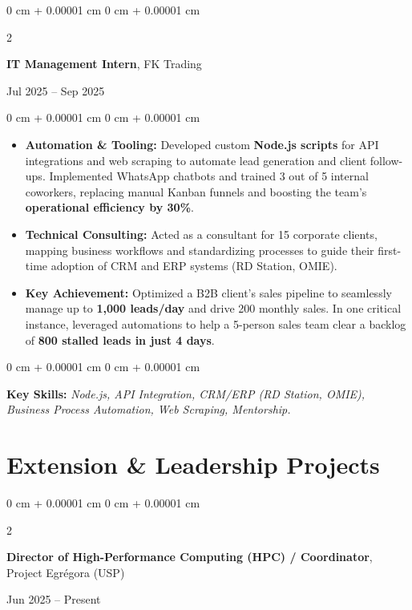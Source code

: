 \documentclass[10pt, letterpaper]{article}
\newenvironment{highlights}{
    \begin{itemize}[
        topsep=0.10 cm,
        parsep=0.10 cm,
        partopsep=0pt,
        itemsep=0pt,
        leftmargin=0 cm + 10pt
    ]
}{
    \end{itemize}
} %
\newenvironment{onecolentry}{
    \begin{adjustwidth}{
        0 cm + 0.00001 cm
    }{
        0 cm + 0.00001 cm
    }
}{
    \end{adjustwidth}
} %
\newenvironment{twocolentry}[2][]{
    \onecolentry
    \def\secondColumn{#2}
    \setcolumnwidth{\fill, 4.5 cm}
    \begin{paracol}{2}
}{
    \switchcolumn \raggedleft \secondColumn
    \end{paracol}
    \endonecolentry
} %
\begin{document}
\vspace{0.20 cm}

\begin{twocolentry}{
    Jul 2025 – Sep 2025
}
    \textbf{IT Management Intern}, FK Trading
\end{twocolentry}

\vspace{0.10 cm}
\begin{onecolentry}
\begin{highlights}
        \item \textbf{Automation \& Tooling:} Developed custom \textbf{Node.js scripts} for API integrations and web scraping to automate lead generation and client follow-ups. Implemented WhatsApp chatbots and trained 3 out of 5 internal coworkers, replacing manual Kanban funnels and boosting the team's \textbf{operational efficiency by 30\%}.
        \item \textbf{Technical Consulting:} Acted as a consultant for 15 corporate clients, mapping business workflows and standardizing processes to guide their first-time adoption of CRM and ERP systems (RD Station, OMIE).
        \item \textbf{Key Achievement:} Optimized a B2B client's sales pipeline to seamlessly manage up to \textbf{1,000 leads/day} and drive 200 monthly sales. In one critical instance, leveraged automations to help a 5-person sales team clear a backlog of \textbf{800 stalled leads in just 4 days}.
    \end{highlights}
\end{onecolentry}
\vspace{0.10 cm}
\begin{onecolentry}
    \setlength{\leftskip}{0.3cm}
    {\footnotesize \textbf{Key Skills:} \textit{Node.js, API Integration, CRM/ERP (RD Station, OMIE), Business Process Automation, Web Scraping, Mentorship.}}
\end{onecolentry}

\vspace{0.15 cm}

\section{Extension \& Leadership Projects}

\begin{twocolentry}{
    Jun 2025 – Present
}
    \textbf{Director of High-Performance Computing (HPC) / Coordinator}, Project Egrégora (USP)
\end{twocolentry}
\end{document}
